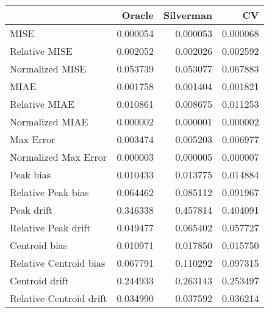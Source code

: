 \begin{tabular}{lrrr}
  \hline
 & Oracle & Silverman & CV \\ 
  \hline
MISE & 0.000054 & 0.000053 & 0.000068 \\ 
  Relative MISE & 0.002052 & 0.002026 & 0.002592 \\ 
  Normalized MISE & 0.053739 & 0.053077 & 0.067883 \\ 
  MIAE & 0.001758 & 0.001404 & 0.001821 \\ 
  Relative MIAE & 0.010861 & 0.008675 & 0.011253 \\ 
  Normalized MIAE & 0.000002 & 0.000001 & 0.000002 \\ 
  Max Error & 0.003474 & 0.005203 & 0.006977 \\ 
  Normalized Max Error & 0.000003 & 0.000005 & 0.000007 \\ 
  Peak bias & 0.010433 & 0.013775 & 0.014884 \\ 
  Relative Peak bias & 0.064462 & 0.085112 & 0.091967 \\ 
  Peak drift & 0.346338 & 0.457814 & 0.404091 \\ 
  Relative Peak drift & 0.049477 & 0.065402 & 0.057727 \\ 
  Centroid bias & 0.010971 & 0.017850 & 0.015750 \\ 
  Relative Centroid bias & 0.067791 & 0.110292 & 0.097315 \\ 
  Centroid drift & 0.244933 & 0.263143 & 0.253497 \\ 
  Relative Centroid drift & 0.034990 & 0.037592 & 0.036214 \\ 
   \hline
\end{tabular}
